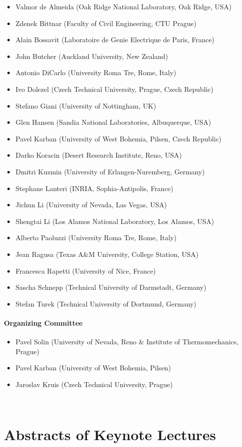\documentclass[article,A4,11pt]{llncs}%
\begin{document}
\begin{itemize}
\item Valmor de Almeida (Oak Ridge National Laboratory, Oak Ridge, USA)
\item Zdenek Bittnar (Faculty of Civil Engineering, CTU Prague)
\item Alain Bossavit (Laboratoire de Genie Electrique de Paris, France)
\item John Butcher (Auckland University, New Zealand)
\item Antonio DiCarlo (University Roma Tre, Rome, Italy)
\item Ivo Dolezel (Czech Technical University, Prague, Czech Republic)
\item Stefano Giani (University of Nottingham, UK)
\item Glen Hansen (Sandia National Laboratories, Albuquerque, USA)
\item Pavel Karban (University of West Bohemia, Pilsen, Czech Republic)
\item Darko Koracin (Desert Research Institute, Reno, USA)
\item Dmitri Kuzmin (University of Erlangen-Nuremberg, Germany)
\item Stephane Lanteri (INRIA, Sophia-Antipolis, France)
\item Jichun Li (University of Nevada, Las Vegas, USA)
\item Shengtai Li (Los Alamos National Laboratory, Los Alamos, USA)
\item Alberto Paoluzzi (University Roma Tre, Rome, Italy)
\item Jean Ragusa (Texas A\&M University, College Station, USA)
\item Francesca Rapetti (University of Nice, France)
\item Sascha Schnepp (Technical University of Darmstadt, Germany)
\item Stefan Turek (Technical University of Dortmund, Germany)
\end{itemize}

\subsection*{Organizing Committee}

\begin{itemize}
\item Pavel Solin (University of Nevada, Reno \& Institute of Thermomechanics, Prague)
\item Pavel Karban  (University of West Bohemia, Pilsen)
\item Jaroslav Kruis (Czech Technical University, Prague)
\end{itemize}

\newpage
{\ }

\tableofcontents

\part{Abstracts of Keynote Lectures}

\pagestyle{plain}
\end{document}

